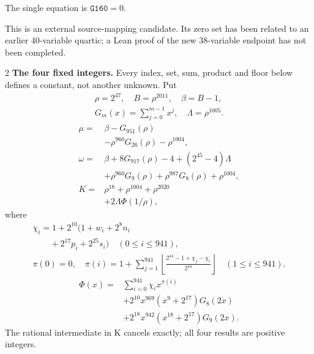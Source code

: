 \documentclass[10pt]{article}
\newcommand{\fl}[1]{\left\lfloor#1\right\rfloor}
\begin{document}
\noindent The single equation is $\boxed{\mathtt{G160}=0}$.
\par\medskip
This is an external source-mapping candidate. Its zero set has been related to
an earlier 40-variable quartic; a Lean proof of the new 38-variable endpoint
has not been completed.
\bigskip
\begin{multicols}{2}\fontsize{7.7}{8.2}\selectfont
\textbf{The four fixed integers.}
Every index, set, sum, product and floor below defines a constant, not
another unknown. Put
\[
\begin{gathered}
\rho=2^{47},\quad B=\rho^{2011},\quad\beta=B-1,\\
G_m(x)=\sum_{j=0}^{m-1}x^j,\quad
\Lambda=\rho^{1005}.
\end{gathered}
\]
\begin{align*}
\mu={}&\beta-G_{951}(\rho)\\
&-\rho^{960}G_{26}(\rho)-\rho^{1004},\\
\omega={}&\beta+8G_{917}(\rho)-4+(2^{45}-4)\Lambda\\
&+\rho^{960}G_9(\rho)+\rho^{987}G_8(\rho)
  +\rho^{1004},\\
K={}&\rho^{18}+\rho^{1004}+\rho^{2020}\\
&+2\Lambda\Phi(1/\rho),
\end{align*}
where
\[
\begin{gathered}
\chi_i=1+2^{10}(1+w_i+2^8n_i\\
\qquad+2^{17}p_i+2^{25}s_i)\quad(0\le i\le941),\\
\pi(0)=0,\quad\pi(i)=1+\sum_{j=1}^{941}
\fl{\frac{2^{44}-1+\chi_j-\chi_i}{2^{44}}}\quad(1\le i\le941).
\end{gathered}
\]
\[
\begin{split}
\Phi(x)={}&\sum_{i=0}^{941}\chi_i x^{\pi(i)}\\
&+2^{10}x^{969}(x^9+2^{17})G_8(2x)\\
&+2^{18}x^{942}(x^{18}+2^{17})G_9(2x).
\end{split}
\]
The rational intermediate in K cancels exactly; all four results are positive integers.


\end{multicols}
\end{document}
